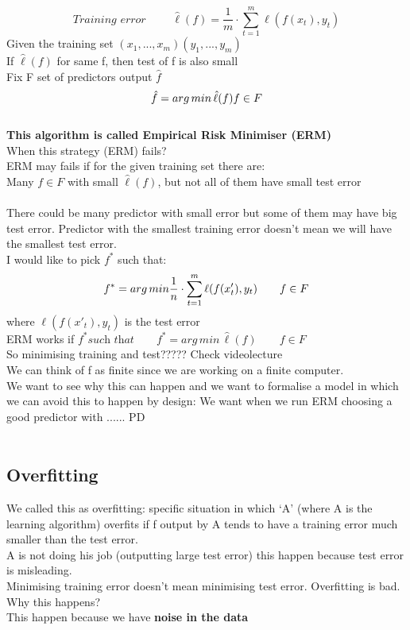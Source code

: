 \documentclass[../main.tex]{subfiles}
\begin{document}
$$
\textit{Training error }\qquad \hat{\ell}(f) = \frac{1}{m}\cdot \sum_{t=1}^{m} \ell(f(x_t),y_t)
$$
Given the training set $(x_1,...,x_m) (y_1,...,y_m)$
\\
If $\hat{\ell}(f)$ for same f, then test of f is also small
\\
Fix F set of predictors output $\hat{f}$\\
$$ \hat{f} = arg\,min\, \hat{\ell}(f)\\ f \in F $$
\\
\textbf{This algorithm is called Empirical Risk Minimiser (ERM)}
\\
When this strategy (ERM) fails?\\
ERM may fails if for the given training set there are:\\
Many $f \in F$ with small $\hat{\ell}(f)$, but not all of them have small test error
\\\\
There could be many predictor with small error but some of them may have big test error. Predictor with the smallest training error doesn’t mean we will
have the smallest test error.\\
I would like to pick $f^*$ such that:
$$ f^* = arg\,min \frac{1}{n} \cdot \sum_{t=1}^{m} \ell(f(x'_t),y_t) \\ \qquad f \in F $$
where $\ell(f(x'_t),y_t)$ is the test error
\\
ERM works if $f^* \textit{such that} \qquad f^* = arg\,min\, \hat{\ell}(f)\qquad f \in F$
\\
So minimising training and test????? Check videolecture\\
We can think of f as finite since we are working on a finite computer.\\
We want to see why this can happen and we want to formalise a model in
which we can avoid this to happen by design:
We want when we run ERM choosing a good predictor with ...... PD\\\\


\subsection{Overfitting}
We called this as overfitting: specific situation in which ‘A’ (where A is the
learning algorithm) overfits if f output by A tends to have a training error much
smaller than the test error.\\
A is not doing his job (outputting large test error) this happen because test
error is misleading.\\
Minimising training error doesn’t mean minimising test error. Overfitting is bad.\\
Why this happens?\\
This happen because we have \textbf{noise in the data}\\
\end{document}
